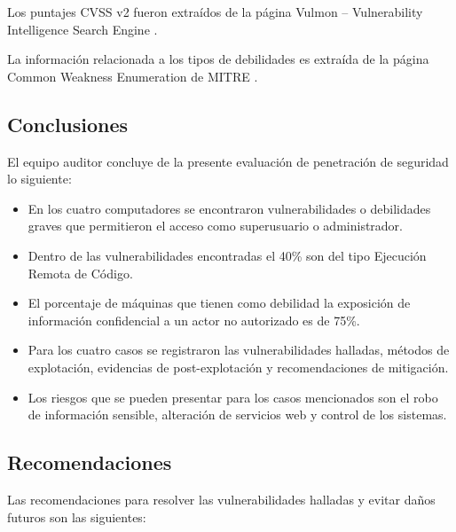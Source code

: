 \documentclass[a4paper]{article}
\begin{document}
\vspace{0.1cm}
Los puntajes CVSS v2 fueron extraídos de la página Vulmon – Vulnerability Intelligence Search Engine \cite{vulmon}.

\vspace{0.1cm}
La información relacionada a los tipos de debilidades es extraída de la página Common Weakness Enumeration de MITRE \cite{cwe}.
\clearpage
    
    
    
    
\clearpage
\begin{center}
    \section*{Conclusiones}
\end{center}
El equipo auditor concluye de la presente evaluación de penetración de seguridad lo siguiente:
\begin{itemize}
    \item En los cuatro computadores se encontraron vulnerabilidades o debilidades graves que permitieron el acceso como superusuario o administrador.
    \item Dentro de las vulnerabilidades encontradas el 40\% son del tipo Ejecución Remota de Código.
    \item El porcentaje de máquinas que tienen como debilidad la exposición de información confidencial a un actor no autorizado es de 75\%.
    \item Para los cuatro casos se registraron las vulnerabilidades halladas, métodos de explotación, evidencias de post-explotación y recomendaciones de mitigación.
    \item Los riesgos que se pueden presentar para los casos mencionados son el robo de información sensible, alteración de servicios web y control de los sistemas.
\end{itemize}
\clearpage
\begin{center}
    \section*{Recomendaciones}
\end{center}
Las recomendaciones para resolver las vulnerabilidades halladas y evitar daños futuros son las siguientes:
\end{document}
